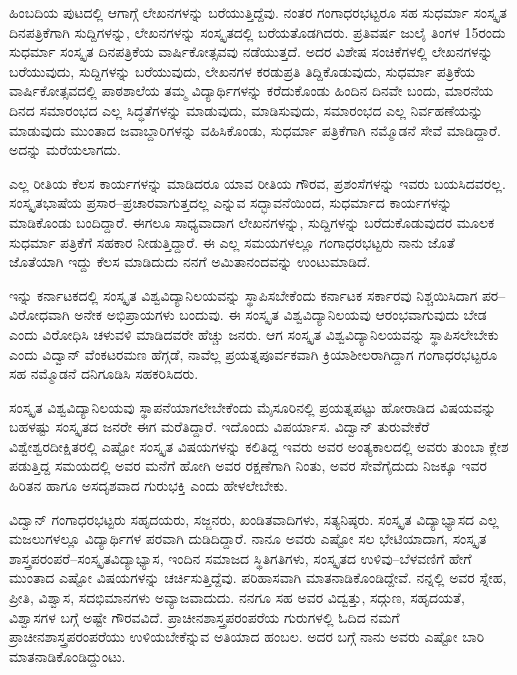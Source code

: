 {ಹಿಂಬದಿಯ ಪುಟದಲ್ಲಿ ಆಗಾಗ್ಗೆ ಲೇಖನಗಳನ್ನು ಬರೆಯುತ್ತಿದ್ದೆವು. ನಂತರ ಗಂಗಾಧರಭಟ್ಟರೂ ಸಹ ಸುಧರ್ಮಾ ಸಂಸ್ಕೃತ ದಿನಪತ್ರಿಕೆಗಾಗಿ ಸುದ್ದಿಗಳನ್ನು, ಲೇಖನಗಳನ್ನು ಸಂಸ್ಕೃತದಲ್ಲಿ ಬರೆಯತೊಡಗಿದರು. ಪ್ರತಿವರ್ಷ ಜುಲೈ ತಿಂಗಳ 15ರಂದು ಸುಧರ್ಮಾ ಸಂಸ್ಕೃತ ದಿನಪತ್ರಿಕೆಯ ವಾರ್ಷಿಕೋತ್ಸವವು ನಡೆಯುತ್ತದೆ. ಅದರ ವಿಶೇಷ ಸಂಚಿಕೆಗಳಲ್ಲಿ ಲೇಖನಗಳನ್ನು ಬರೆಯುವುದು, ಸುದ್ದಿಗಳನ್ನು ಬರೆಯುವುದು, ಲೇಖನಗಳ ಕರಡುಪ್ರತಿ ತಿದ್ದಿಕೊಡುವುದು, ಸುಧರ್ಮಾ ಪತ್ರಿಕೆಯ ವಾರ್ಷಿಕೋತ್ಸವದಲ್ಲಿ ಪಾಠಶಾಲೆಯ ತಮ್ಮ ವಿದ್ಯಾರ್ಥಿಗಳನ್ನು ಕರೆದುಕೊಂಡು ಹಿಂದಿನ ದಿನವೇ ಬಂದು, ಮಾರನೆಯ ದಿನದ ಸಮಾರಂಭದ ಎಲ್ಲ ಸಿದ್ಧತೆಗಳನ್ನು ಮಾಡುವುದು, ಮಾಡಿಸುವುದು, ಸಮಾರಂಭದ ಎಲ್ಲ ನಿರ್ವಹಣೆಯನ್ನು ಮಾಡುವುದು ಮುಂತಾದ ಜವಾಬ್ದಾರಿಗಳನ್ನು ವಹಿಸಿಕೊಂಡು, ಸುಧರ್ಮಾ ಪತ್ರಿಕೆಗಾಗಿ ನಮ್ಮೊಡನೆ ಸೇವೆ ಮಾಡಿದ್ದಾರೆ. ಅದನ್ನು ಮರೆಯಲಾಗದು. 

ಎಲ್ಲ ರೀತಿಯ ಕೆಲಸ ಕಾರ್ಯಗಳನ್ನು ಮಾಡಿದರೂ ಯಾವ ರೀತಿಯ ಗೌರವ, ಪ್ರಶಂಸೆಗಳನ್ನು ಇವರು ಬಯಸಿದವರಲ್ಲ. ಸಂಸ್ಕೃತಭಾಷೆಯ ಪ್ರಸಾರ–ಪ್ರಚಾರವಾಗುತ್ತದಲ್ಲ ಎನ್ನುವ ಸದ್ಭಾವನೆಯಿಂದ, ಸುಧರ್ಮಾದ ಕಾರ್ಯಗಳನ್ನು ಮಾಡಿಕೊಂಡು ಬಂದಿದ್ದಾರೆ. ಈಗಲೂ ಸಾಧ್ಯವಾದಾಗ ಲೇಖನಗಳನ್ನು, ಸುದ್ದಿಗಳನ್ನು ಬರೆದುಕೊಡುವುದರ ಮೂಲಕ ಸುಧರ್ಮಾ ಪತ್ರಿಕೆಗೆ ಸಹಕಾರ ನೀಡುತ್ತಿದ್ದಾರೆ. ಈ ಎಲ್ಲ ಸಮಯಗಳಲ್ಲೂ ಗಂಗಾಧರಭಟ್ಟರು ನಾನು ಜೊತೆ ಜೊತೆಯಾಗಿ ಇದ್ದು ಕೆಲಸ ಮಾಡಿದುದು ನನಗೆ ಅಮಿತಾನಂದವನ್ನು ಉಂಟುಮಾಡಿದೆ.

ಇನ್ನು ಕರ್ನಾಟಕದಲ್ಲಿ ಸಂಸ್ಕೃತ ವಿಶ್ವವಿದ್ಯಾನಿಲಯವನ್ನು ಸ್ಥಾಪಿಸಬೇಕೆಂದು ಕರ್ನಾಟಕ ಸರ್ಕಾರವು ನಿಶ್ಚಯಿಸಿದಾಗ ಪರ–ವಿರೋಧವಾಗಿ ಅನೇಕ ಅಭಿಪ್ರಾಯಗಳು ಬಂದುವು. ಈ ಸಂಸ್ಕೃತ ವಿಶ್ವವಿದ್ಯಾನಿಲಯವು ಆರಂಭವಾಗುವುದು ಬೇಡ ಎಂದು ವಿರೋಧಿಸಿ ಚಳುವಳಿ ಮಾಡಿದವರೇ ಹೆಚ್ಚು ಜನರು. ಆಗ ಸಂಸ್ಕೃತ ವಿಶ್ವವಿದ್ಯಾನಿಲಯವನ್ನು ಸ್ಥಾಪಿಸಲೇಬೇಕು ಎಂದು ವಿದ್ವಾನ್ ವೆಂಕಟರಮಣ ಹೆಗ್ಗಡೆ, ನಾವೆಲ್ಲ ಪ್ರಯತ್ನಪೂರ್ವಕವಾಗಿ ಕ್ರಿಯಾಶೀಲರಾಗಿದ್ದಾಗ ಗಂಗಾಧರಭಟ್ಟರೂ ಸಹ ನಮ್ಮೊಡನೆ ದನಿಗೂಡಿಸಿ ಸಹಕರಿಸಿದರು.     

ಸಂಸ್ಕೃತ ವಿಶ್ವವಿದ್ಯಾನಿಲಯವು ಸ್ಥಾಪನೆಯಾಗಲೇಬೇಕೆಂದು ಮೈಸೂರಿನಲ್ಲಿ ಪ್ರಯತ್ನಪಟ್ಟು ಹೋರಾಡಿದ ವಿಷಯವನ್ನು ಬಹಳಷ್ಟು ಸಂಸ್ಕೃತದ ಜನರೇ ಈಗ ಮರೆತಿದ್ದಾರೆ. ಇದೊಂದು ವಿಪರ್ಯಾಸ. ವಿದ್ವಾನ್ ತುರುವೇಕೆರೆ ವಿಶ್ವೇಶ್ವರದೀಕ್ಷಿತರಲ್ಲಿ ಎಷ್ಟೋ ಸಂಸ್ಕೃತ ವಿಷಯಗಳನ್ನು ಕಲಿತಿದ್ದ ಇವರು ಅವರ ಅಂತ್ಯಕಾಲದಲ್ಲಿ ಅವರು ತುಂಬಾ ಕ್ಲೇಶ ಪಡುತ್ತಿದ್ದ ಸಮಯದಲ್ಲಿ ಅವರ ಮನೆಗೆ ಹೋಗಿ ಅವರ ರಕ್ಷಣೆಗಾಗಿ ನಿಂತು, ಅವರ ಸೇವೆಗೈದುದು ನಿಜಕ್ಕೂ ಇವರ ಹಿರಿತನ ಹಾಗೂ ಅಸದೃಶವಾದ ಗುರುಭಕ್ತಿ ಎಂದು ಹೇಳಲೇಬೇಕು.

ವಿದ್ವಾನ್ ಗಂಗಾಧರಭಟ್ಟರು ಸಹೃದಯರು, ಸಜ್ಜನರು, ಖಂಡಿತವಾದಿಗಳು, ಸತ್ಯನಿಷ್ಠರು. ಸಂಸ್ಕೃತ ವಿದ್ಯಾಭ್ಯಾಸದ ಎಲ್ಲ ಮಜಲುಗಳಲ್ಲೂ ವಿದ್ಯಾರ್ಥಿಗಳ ಪರವಾಗಿ ದುಡಿದಿದ್ದಾರೆ. ನಾನೂ ಅವರು ಎಷ್ಟೋ ಸಲ ಭೇಟಿಯಾದಾಗ, ಸಂಸ್ಕೃತ ಶಾಸ್ತ್ರಪರಂಪರೆ–ಸಂಸ್ಕೃತವಿದ್ಯಾಭ್ಯಾಸ, ಇಂದಿನ ಸಮಾಜದ ಸ್ಥಿತಿಗತಿಗಳು, ಸಂಸ್ಕೃತದ ಉಳಿವು–ಬೆಳವಣಿಗೆ ಹೇಗೆ ಮುಂತಾದ ಎಷ್ಟೋ ವಿಷಯಗಳನ್ನು ಚರ್ಚಿಸುತ್ತಿದ್ದೆವು. ಪರಿಹಾಸವಾಗಿ ಮಾತನಾಡಿಕೊಂಡಿದ್ದೇವೆ. ನನ್ನಲ್ಲಿ ಅವರ ಸ್ನೇಹ, ಪ್ರೀತಿ, ವಿಶ್ವಾಸ, ಸದಭಿಮಾನಗಳು ಅವ್ಯಾಜವಾದುದು. ನನಗೂ ಸಹ ಅವರ ವಿದ್ವತ್ತು, ಸದ್ಗುಣ, ಸಹೃದಯತೆ, ವಿಶ್ವಾಸಗಳ ಬಗ್ಗೆ ಅಷ್ಟೇ ಗೌರವವಿದೆ. ಪ್ರಾಚೀನಶಾಸ್ತ್ರಪರಂಪರೆಯ ಗುರುಗಳಲ್ಲಿ ಓದಿದ ನಮಗೆ ಪ್ರಾಚೀನಶಾಸ್ತ್ರಪರಂಪರೆಯು ಉಳಿಯಬೇಕೆನ್ನುವ ಅತಿಯಾದ ಹಂಬಲ. ಅದರ ಬಗ್ಗೆ ನಾನು ಅವರು ಎಷ್ಟೋ ಬಾರಿ ಮಾತನಾಡಿಕೊಂಡಿದ್ದುಂಟು.

}
